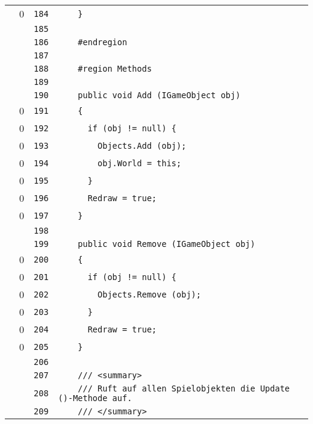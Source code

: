 \documentclass[a4paper,10pt]{article}
\begin{document}
\begin{longtable}[l]{lrrl}
\cellcolor{red} & 0 & \verb~184~ & \verb~    }~\\
\cellcolor{gray} &  & \verb~185~ & \verb~~\\
\cellcolor{gray} &  & \verb~186~ & \verb~    #endregion~\\
\cellcolor{gray} &  & \verb~187~ & \verb~~\\
\cellcolor{gray} &  & \verb~188~ & \verb~    #region Methods~\\
\cellcolor{gray} &  & \verb~189~ & \verb~~\\
\cellcolor{gray} &  & \verb~190~ & \verb~    public void Add (IGameObject obj)~\\
\cellcolor{red} & 0 & \verb~191~ & \verb~    {~\\
\cellcolor{red} & 0 & \verb~192~ & \verb~      if (obj != null) {~\\
\cellcolor{red} & 0 & \verb~193~ & \verb~        Objects.Add (obj);~\\
\cellcolor{red} & 0 & \verb~194~ & \verb~        obj.World = this;~\\
\cellcolor{red} & 0 & \verb~195~ & \verb~      }~\\
\cellcolor{red} & 0 & \verb~196~ & \verb~      Redraw = true;~\\
\cellcolor{red} & 0 & \verb~197~ & \verb~    }~\\
\cellcolor{gray} &  & \verb~198~ & \verb~~\\
\cellcolor{gray} &  & \verb~199~ & \verb~    public void Remove (IGameObject obj)~\\
\cellcolor{red} & 0 & \verb~200~ & \verb~    {~\\
\cellcolor{red} & 0 & \verb~201~ & \verb~      if (obj != null) {~\\
\cellcolor{red} & 0 & \verb~202~ & \verb~        Objects.Remove (obj);~\\
\cellcolor{red} & 0 & \verb~203~ & \verb~      }~\\
\cellcolor{red} & 0 & \verb~204~ & \verb~      Redraw = true;~\\
\cellcolor{red} & 0 & \verb~205~ & \verb~    }~\\
\cellcolor{gray} &  & \verb~206~ & \verb~~\\
\cellcolor{gray} &  & \verb~207~ & \verb~    /// <summary>~\\
\cellcolor{gray} &  & \verb~208~ & \verb~    /// Ruft auf allen Spielobjekten die Update ()-Methode auf.~\\
\cellcolor{gray} &  & \verb~209~ & \verb~    /// </summary>~\\

\end{longtable}
\end{document}
